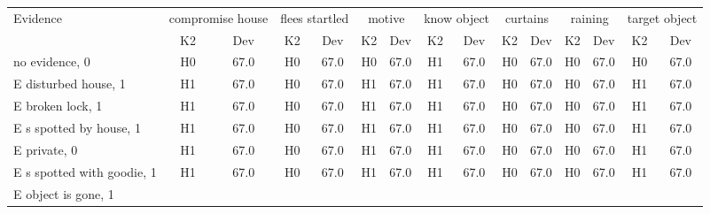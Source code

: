 \begin{table}\begin{tabular}{l|cc|cc|cc|cc|cc|cc|cc}\toprule\multirow{2}{*}{Evidence} & \multicolumn{2}{c}{compromise house}& \multicolumn{2}{c}{flees startled}& \multicolumn{2}{c}{motive}& \multicolumn{2}{c}{know object}& \multicolumn{2}{c}{curtains}& \multicolumn{2}{c}{raining}& \multicolumn{2}{c}{target object}\\& {K2} & {Dev}& {K2} & {Dev}& {K2} & {Dev}& {K2} & {Dev}& {K2} & {Dev}& {K2} & {Dev}& {K2} & {Dev}\\\midrule
no evidence, 0 & \cellcolor{Bittersweet}H0&\cellcolor{Bittersweet}67.0&\cellcolor{Bittersweet}H0&\cellcolor{Bittersweet}67.0&\cellcolor{Bittersweet}H0&\cellcolor{Bittersweet}67.0&\cellcolor{Bittersweet}H1&\cellcolor{Bittersweet}67.0&\cellcolor{Bittersweet}H0&\cellcolor{Bittersweet}67.0&\cellcolor{Bittersweet}H0&\cellcolor{Bittersweet}67.0&\cellcolor{Bittersweet}H0&\cellcolor{Bittersweet}67.0\\E disturbed house, 1 & \cellcolor{Bittersweet}H1&\cellcolor{Bittersweet}67.0&\cellcolor{Bittersweet}H0&\cellcolor{Bittersweet}67.0&\cellcolor{Bittersweet}H1&\cellcolor{Bittersweet}67.0&\cellcolor{Bittersweet}H1&\cellcolor{Bittersweet}67.0&\cellcolor{Bittersweet}H0&\cellcolor{Bittersweet}67.0&\cellcolor{Bittersweet}H0&\cellcolor{Bittersweet}67.0&\cellcolor{Bittersweet}H1&\cellcolor{Bittersweet}67.0\\E broken lock, 1 & \cellcolor{Bittersweet}H1&\cellcolor{Bittersweet}67.0&\cellcolor{Bittersweet}H0&\cellcolor{Bittersweet}67.0&\cellcolor{Bittersweet}H1&\cellcolor{Bittersweet}67.0&\cellcolor{Bittersweet}H1&\cellcolor{Bittersweet}67.0&\cellcolor{Bittersweet}H0&\cellcolor{Bittersweet}67.0&\cellcolor{Bittersweet}H0&\cellcolor{Bittersweet}67.0&\cellcolor{Bittersweet}H1&\cellcolor{Bittersweet}67.0\\E s spotted by house, 1 & \cellcolor{Bittersweet}H1&\cellcolor{Bittersweet}67.0&\cellcolor{Bittersweet}H0&\cellcolor{Bittersweet}67.0&\cellcolor{Bittersweet}H1&\cellcolor{Bittersweet}67.0&\cellcolor{Bittersweet}H1&\cellcolor{Bittersweet}67.0&\cellcolor{Bittersweet}H0&\cellcolor{Bittersweet}67.0&\cellcolor{Bittersweet}H0&\cellcolor{Bittersweet}67.0&\cellcolor{Bittersweet}H1&\cellcolor{Bittersweet}67.0\\E private, 0 & \cellcolor{Bittersweet}H1&\cellcolor{Bittersweet}67.0&\cellcolor{Bittersweet}H0&\cellcolor{Bittersweet}67.0&\cellcolor{Bittersweet}H1&\cellcolor{Bittersweet}67.0&\cellcolor{Bittersweet}H1&\cellcolor{Bittersweet}67.0&\cellcolor{Bittersweet}H0&\cellcolor{Bittersweet}67.0&\cellcolor{Bittersweet}H0&\cellcolor{Bittersweet}67.0&\cellcolor{Bittersweet}H1&\cellcolor{Bittersweet}67.0\\E s spotted with goodie, 1 & \cellcolor{Bittersweet}H1&\cellcolor{Bittersweet}67.0&\cellcolor{Bittersweet}H0&\cellcolor{Bittersweet}67.0&\cellcolor{Bittersweet}H1&\cellcolor{Bittersweet}67.0&\cellcolor{Bittersweet}H1&\cellcolor{Bittersweet}67.0&\cellcolor{Bittersweet}H0&\cellcolor{Bittersweet}67.0&\cellcolor{Bittersweet}H0&\cellcolor{Bittersweet}67.0&\cellcolor{Bittersweet}H1&\cellcolor{Bittersweet}67.0\\E object is gone, 1 & 
\end{tabular}
\end{table}
